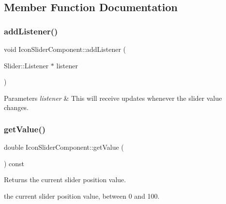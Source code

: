 \subsection{Member Function Documentation}
\mbox{\label{classIconSliderComponent_ab00c8bce56d11493fcb2e8b8b6e10fdc}} 
\subsubsection{\texorpdfstring{add\+Listener()}{addListener()}}
{\footnotesize\ttfamily void Icon\+Slider\+Component\+::add\+Listener (\begin{DoxyParamCaption}\item[{Slider\+::\+Listener $\ast$}]{listener }\end{DoxyParamCaption})}


\begin{DoxyParams}{Parameters}
{\em listener} & This will receive updates whenever the slider value changes. \\
\hline
\end{DoxyParams}
\mbox{\label{classIconSliderComponent_a755a7a4ebd11f09186a80932339846d9}} 
\subsubsection{\texorpdfstring{get\+Value()}{getValue()}}
{\footnotesize\ttfamily double Icon\+Slider\+Component\+::get\+Value (\begin{DoxyParamCaption}{ }\end{DoxyParamCaption}) const}

\begin{DoxyReturn}{Returns}
the current slider position value.

the current slider position value, between 0 and 100. 
\end{DoxyReturn}
\mbox{\label{classIconSliderComponent_a324baf259469f2d08069b2f26c61f3d1}} 
